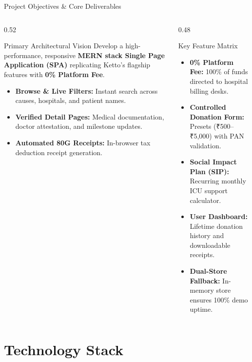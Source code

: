 \documentclass[aspectratio=169, 10pt]{beamer}
\begin{document}
\begin{frame}{Project Objectives \& Core Deliverables}
  \begin{columns}[T]
    \begin{column}{0.52\textwidth}
      \begin{block}{Primary Architectural Vision}
        Develop a high-performance, responsive \textbf{MERN stack Single Page Application (SPA)} replicating Ketto's flagship features with \textbf{0\% Platform Fee}.
      \end{block}
      \begin{itemize}
        \item \textbf{Browse \& Live Filters:} Instant search across causes, hospitals, and patient names.
        \item \textbf{Verified Detail Pages:} Medical documentation, doctor attestation, and milestone updates.
        \item \textbf{Automated 80G Receipts:} In-browser tax deduction receipt generation.
      \end{itemize}
    \end{column}
    \begin{column}{0.48\textwidth}
      \begin{exampleblock}{Key Feature Matrix}
        \begin{itemize}
          \item \textbf{0\% Platform Fee:} 100\% of funds directed to hospital billing desks.
          \item \textbf{Controlled Donation Form:} Presets (₹500--₹5,000) with PAN validation.
          \item \textbf{Social Impact Plan (SIP):} Recurring monthly ICU support calculator.
          \item \textbf{User Dashboard:} Lifetime donation history and downloadable receipts.
          \item \textbf{Dual-Store Fallback:} In-memory store ensures 100\% demo uptime.
        \end{itemize}
      \end{exampleblock}
    \end{column}
  \end{columns}
\end{frame}

\section{Technology Stack}
\end{document}
